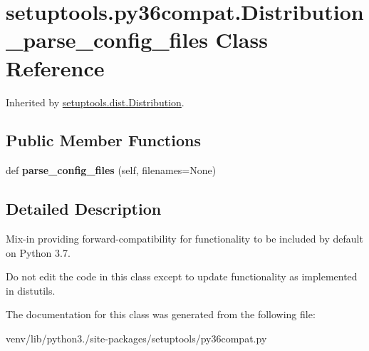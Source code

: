 \hypertarget{classsetuptools_1_1py36compat_1_1_distribution__parse__config__files}{}\section{setuptools.\+py36compat.\+Distribution\+\_\+parse\+\_\+config\+\_\+files Class Reference}
\label{classsetuptools_1_1py36compat_1_1_distribution__parse__config__files}


Inherited by \hyperlink{classsetuptools_1_1dist_1_1_distribution}{setuptools.\+dist.\+Distribution}.

\subsection*{Public Member Functions}
\begin{DoxyCompactItemize}
\item 
\mbox{\label{classsetuptools_1_1py36compat_1_1_distribution__parse__config__files_af4cdc462269ab5b6dfc9425bcc2b28dc}} 
def {\bfseries parse\+\_\+config\+\_\+files} (self, filenames=None)
\end{DoxyCompactItemize}


\subsection{Detailed Description}
\begin{DoxyVerb}Mix-in providing forward-compatibility for functionality to be
included by default on Python 3.7.

Do not edit the code in this class except to update functionality
as implemented in distutils.
\end{DoxyVerb}
 

The documentation for this class was generated from the following file\+:\begin{DoxyCompactItemize}
\item 
venv/lib/python3./site-\/packages/setuptools/py36compat.\+py\end{DoxyCompactItemize}
